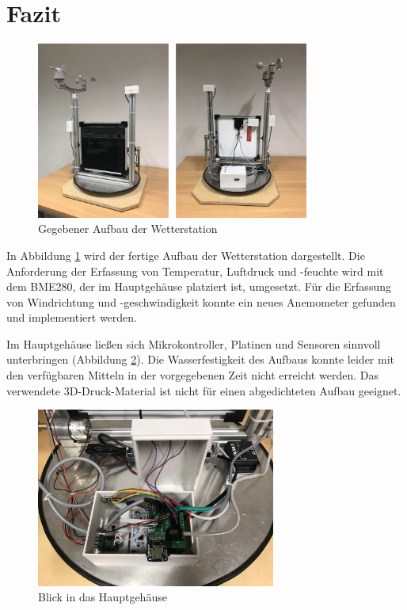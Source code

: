 \section{Fazit}\label{sec:fazit}
\begin{figure}[H]
  \centering
  \includegraphics[width=0.8\textwidth]{./img/Wetterstaion_fertig1.jpg}
  \caption{Gegebener Aufbau der Wetterstation}\label{fig.Wetterstationfertig}
\end{figure}

In Abbildung \ref{fig.Wetterstationfertig} wird der fertige Aufbau der Wetterstation dargestellt. Die Anforderung der Erfassung von Temperatur, Luftdruck und -feuchte wird mit dem BME280, der im Hauptgehäuse platziert ist, umgesetzt. Für die Erfassung von Windrichtung und -geschwindigkeit konnte ein neues Anemometer gefunden und implementiert werden.

Im Hauptgehäuse ließen sich Mikrokontroller, Platinen und Sensoren sinnvoll unterbringen (Abbildung \ref{fig.hauptgehauese}). Die Wasserfestigkeit des Aufbaus konnte leider mit den verfügbaren Mitteln in der vorgegebenen Zeit nicht erreicht werden. Das verwendete 3D-Druck-Material ist nicht für einen abgedichteten Aufbau geeignet. 


\begin{figure}[H]
  \centering
  \includegraphics[width=0.7\textwidth]{./img/Hauptgehauese.jpg}
  \caption{Blick in das Hauptgehäuse}\label{fig.hauptgehauese}
\end{figure}

